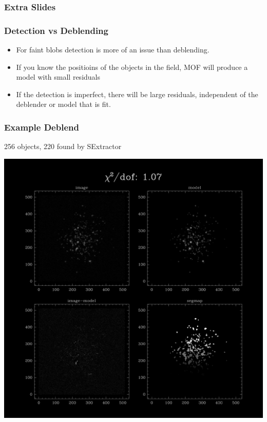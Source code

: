 \documentclass{beamer}
\begin{document}
\frame
{
    \frametitle{Extra Slides}

}

\frame
{
    \frametitle{Detection vs Deblending}

    \begin{itemize}

        \item For faint blobs detection is more of an issue
            than deblending.

        \item If you know the positioins of the objects in the
            field, MOF will produce a model with small residuals

        \item If the detection is imperfect, there will be
            large residuals, independent of the deblender or model
            that is fit.

    \end{itemize}

}

\frame
{
    \frametitle{Example Deblend}

        256 objects, 220 found by SExtractor
    \begin{center}
        \includegraphics[trim={5cm 33cm 5cm 7cm},clip,width=\columnwidth]{diff-20855-000000.png}
    \end{center}
}
\end{document}
